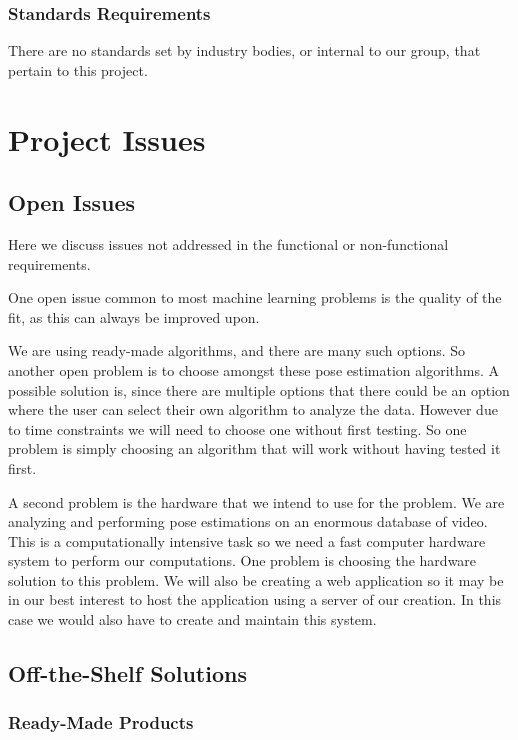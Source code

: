 \documentclass{scrreprt}
\begin{document}
\subsection{Standards Requirements}

There are no standards set by industry bodies, or internal to our group, that
pertain to this project.

\chapter{Project Issues}

\section{Open Issues}

{Here we discuss issues not addressed in the functional or
non-functional requirements.}

One open issue common to most machine learning problems is the quality of the
fit, as this can always be improved upon.

We are using ready-made algorithms, and there are many such options. So
another open problem is to choose amongst these pose estimation algorithms. A
possible solution is, since there are multiple options that there could be an
option where the user can select their own algorithm to analyze the data.
However due to time constraints we will need to choose one without first
testing. So one problem is simply choosing an algorithm that will work without
having tested it first.

A second problem is the hardware that we intend to use for the problem.
We are analyzing and performing pose estimations on an enormous
database of video. This is a computationally intensive task so we need
a fast computer hardware system to perform our computations. One
problem is choosing the hardware solution to this problem. We will also
be creating a web application so it may be in our best interest to host
the application using a server of our creation. In this case we would
also have to create and maintain this system.

\section{Off-the-Shelf Solutions}
\label{off-the-shelf-solutions}

\subsection{Ready-Made Products}
\end{document}
